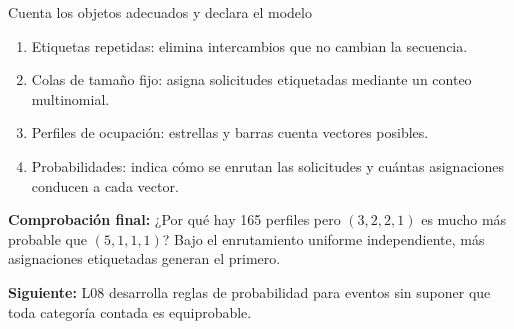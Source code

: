 \documentclass[aspectratio=169,10pt,spanish]{beamer}
\begin{document}
\begin{frame}{Cuenta los objetos adecuados y declara el modelo}
\small
\begin{enumerate}
\item Etiquetas repetidas: elimina intercambios que no cambian la secuencia.
\item Colas de tamaño fijo: asigna solicitudes etiquetadas mediante un conteo multinomial.
\item Perfiles de ocupación: estrellas y barras cuenta vectores posibles.
\item Probabilidades: indica cómo se enrutan las solicitudes y cuántas asignaciones conducen a cada vector.
\end{enumerate}
\par\medskip
\textbf{Comprobación final:} ¿Por qué hay 165 perfiles pero $(3,2,2,1)$ es mucho más probable que $(5,1,1,1)$? Bajo el enrutamiento uniforme independiente, más asignaciones etiquetadas generan el primero.
\par\smallskip
\textbf{Siguiente:} L08 desarrolla reglas de probabilidad para eventos sin suponer que toda categoría contada es equiprobable.
\end{frame}
\end{document}
